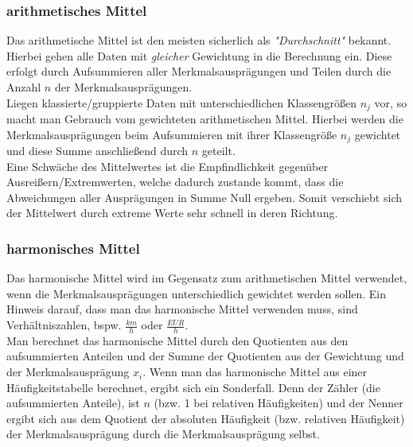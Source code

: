 \documentclass[a4paper]{article}
\begin{document}
\subsubsection{arithmetisches Mittel}\label{sec:arithm}
Das arithmetische Mittel ist den meisten sicherlich als \textit{"Durchschnitt"} bekannt. Hierbei gehen alle Daten mit \textit{gleicher} Gewichtung in die Berechnung ein. Diese erfolgt durch Aufsummieren aller Merkmalsausprägungen und Teilen durch die Anzahl $n$ der Merkmalsausprägungen.\\
Liegen klassierte/gruppierte Daten mit unterschiedlichen Klassengrößen $n_j$ vor, so macht man Gebrauch vom gewichteten arithmetischen Mittel. Hierbei werden die Merkmalsausprägungen beim Aufsummieren mit ihrer Klassengröße $n_j$ gewichtet und diese Summe anschließend durch $n$ geteilt.\\
Eine Schwäche des Mittelwertes ist die Empfindlichkeit gegenüber Ausreißern/Extremwerten, welche dadurch zustande kommt, dass die Abweichungen aller Ausprägungen in Summe Null ergeben. Somit verschiebt sich der Mittelwert durch extreme Werte sehr schnell in deren Richtung.\\

\noindent {}

\subsubsection{harmonisches Mittel}
Das harmonische Mittel wird im Gegensatz zum arithmetischen Mittel verwendet, wenn die Merkmalsausprägungen unterschiedlich gewichtet werden sollen. Ein Hinweis darauf, dass man das harmonische Mittel verwenden muss, sind Verhältniszahlen, bspw. $\frac{km}{h}$ oder $\frac{EUR}{h}$.\\
Man berechnet das harmonische Mittel durch den Quotienten aus den aufsummierten Anteilen und der Summe der Quotienten aus der Gewichtung und der Merkmalsausprägung $x_i$.
Wenn man das harmonische Mittel aus einer Häufigkeitstabelle berechnet, ergibt sich ein Sonderfall. Denn der Zähler (die aufsummierten Anteile), ist $n$ (bzw. 1 bei relativen Häufigkeiten) und der Nenner ergibt sich aus dem Quotient der absoluten Häufigkeit (bzw. relativen Häufigkeit) der Merkmalsausprägung durch die Merkmalsausprägung selbst.\\

\noindent {}
\end{document}

